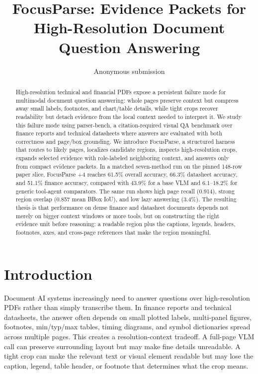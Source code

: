 \documentclass[10pt]{article}
\title{FocusParse: Evidence Packets for High-Resolution Document Question Answering}
\author{Anonymous submission}
\date{}
\begin{document}
\maketitle

\begin{abstract}
High-resolution technical and financial PDFs expose a persistent failure mode
for multimodal document question answering: whole pages preserve context but
compress away small labels, footnotes, and chart/table details, while tight
crops recover readability but detach evidence from the local context needed to
interpret it. We study this failure mode using parser-bench, a
citation-required visual QA benchmark over finance reports and technical
datasheets where answers are evaluated with both correctness and page/box
grounding. We introduce FocusParse, a structured harness that routes to likely
pages, localizes candidate regions, inspects high-resolution crops, expands
selected evidence with role-labeled neighboring context, and answers only from
compact evidence packets. In a matched seven-method run on the pinned 148-row
paper slice, FocusParse +4 reaches 61.5\% overall accuracy, 66.3\% datasheet
accuracy, and 51.1\% finance accuracy, compared with 43.9\% for a base VLM and
6.1--18.2\% for generic tool-agent comparators. The same run shows high page
recall (0.914), strong region overlap (0.857 mean BBox IoU), and low lazy
answering (3.4\%). The resulting thesis is that performance on dense finance
and datasheet documents depends not merely on bigger context windows or more
tools, but on constructing the right evidence unit before reasoning: a readable
region plus the captions, legends, headers, footnotes, axes, and cross-page
references that make the region meaningful.
\end{abstract}

\section{Introduction}

Document AI systems increasingly need to answer questions over high-resolution
PDFs rather than simply transcribe them. In finance reports and technical
datasheets, the answer often depends on small plotted labels, multi-panel
figures, footnotes, min/typ/max tables, timing diagrams, and symbol dictionaries
spread across multiple pages. This creates a resolution-context tradeoff. A
full-page VLM call can preserve surrounding layout but may make fine details
unreadable. A tight crop can make the relevant text or visual element readable
but may lose the caption, legend, table header, or footnote that determines what
the crop means.
\end{document}
